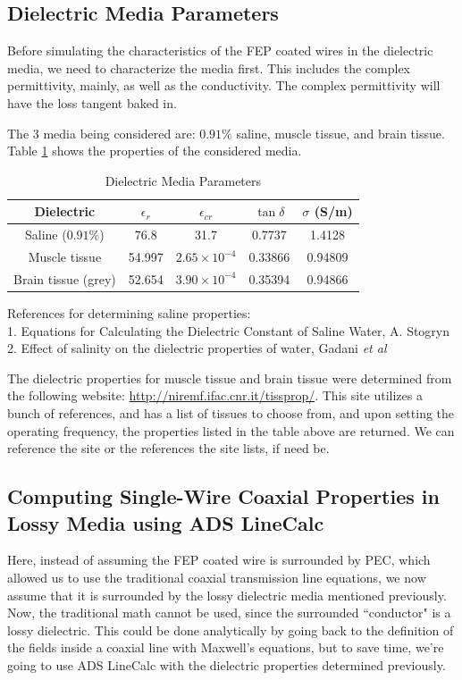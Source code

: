 \documentclass[12pt,onecolumn,titlepage]{article}
\begin{document}
\subsection{Dielectric Media Parameters}
\indent \indent Before simulating the characteristics of the FEP coated wires in the dielectric media, we need to characterize the media first. This includes the complex permittivity, mainly, as well as the conductivity. The complex permittivity will have the loss tangent baked in. 

The 3 media being considered are: $0.91\%$ saline, muscle tissue, and brain tissue. Table \ref{tab:dielectric_media_parameters} shows the properties of the considered media.


\begin{table}[h!]
\centering
	\caption{Dielectric Media Parameters}
	\begin{tabular}{| c | c | c | c | c |}
	\hline
	 Dielectric & $\epsilon_r$ & $\epsilon_{cr}$ & $\tan \delta$ & $\sigma$ (S/m) \\ \hline
	 Saline ($0.91\%$) & 76.8 & 31.7 & 0.7737 & 1.4128 \\ \hline
	 Muscle tissue & 54.997 & $2.65 \times 10^{-4}$ & 0.33866 & 0.94809 \\ \hline
	 Brain tissue (grey) & 52.654 & $3.90 \times 10^{-4}$ & 0.35394 & 0.94866 \\ \hline
	 \end{tabular}
\label{tab:dielectric_media_parameters}
\end{table}

 References for determining saline properties: \\ 
1. Equations for Calculating the Dielectric Constant of Saline Water, A. Stogryn \\
2. Effect of salinity on the dielectric properties of water, Gadani {\emph{et al}}

The dielectric properties for muscle tissue and brain tissue were determined from the following website: \url{http://niremf.ifac.cnr.it/tissprop/}. This site utilizes a bunch of references, and has a list of tissues to choose from, and upon setting the operating frequency, the properties listed in the table above are returned. We can reference the site or the references the site lists, if need be. 


\subsection{Computing Single-Wire Coaxial Properties in Lossy Media using ADS LineCalc}
\indent \indent Here, instead of assuming the FEP coated wire is surrounded by PEC, which allowed us to use the traditional coaxial transmission line equations, we now assume that it is surrounded by the lossy dielectric media mentioned previously. Now, the traditional math cannot be used, since the surrounded ``conductor" is a lossy dielectric. This could be done analytically by going back to the definition of the fields inside a coaxial line with Maxwell's equations, but to save time, we're going to use ADS LineCalc with the dielectric properties determined previously.
\end{document}
